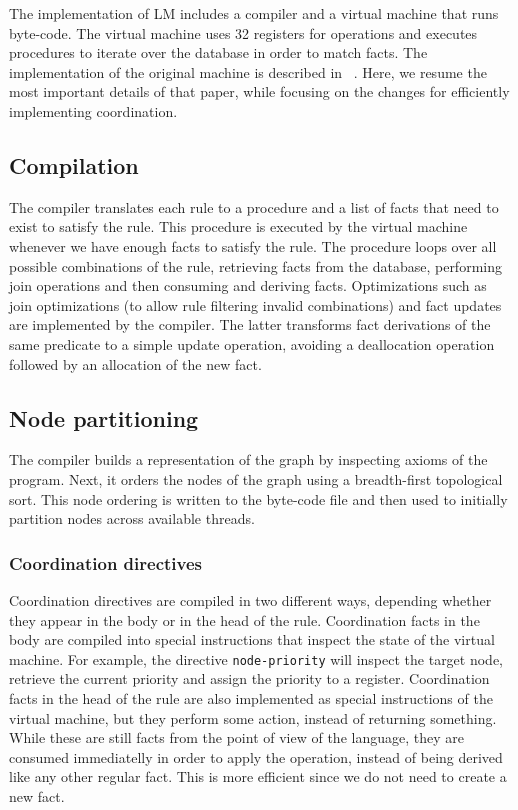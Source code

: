 The implementation of LM includes a compiler and a virtual machine that runs
byte-code. The virtual machine uses 32 registers for
operations and executes procedures to iterate over the database in order to match facts.
The implementation of the original machine is described in ~\cite{cruz-ppdp14}.
Here, we resume the most important details of that paper, while focusing on the
changes for efficiently implementing coordination.

\subsection{Compilation}

The compiler translates each rule to a procedure and a list of facts that need
to exist to satisfy the rule. This procedure is executed by the virtual
machine whenever we have enough facts to satisfy the rule. The procedure
loops over all possible combinations of the rule, retrieving facts from the
database, performing join operations and then consuming and deriving facts.
Optimizations such as join optimizations (to allow rule filtering invalid
combinations) and fact updates are implemented by the compiler. The latter
transforms fact derivations of the same predicate to a simple update operation,
avoiding a deallocation operation followed by an allocation of the new fact.

\subsection{Node partitioning}

The compiler builds a representation of the graph by inspecting axioms of the
program. Next, it orders the nodes of the graph using a breadth-first
topological sort. This node ordering is written to the byte-code file and then
used to initially partition nodes across available threads.

\subsubsection{Coordination directives}

Coordination directives are compiled in two different ways, depending whether they
appear in the body or in the head of the rule. Coordination facts in the body
are compiled into special instructions that inspect the state of the virtual
machine. For example, the directive \texttt{node-priority} will inspect the
target node, retrieve the current priority and assign the priority to a
register. Coordination facts in the head of the rule are also implemented as
special instructions of the virtual machine, but they perform some action,
instead of returning something. While these are still facts from the point of
view of the language, they are consumed immediatelly in order to apply the
operation, instead of being derived like any other regular fact. This is more
efficient since we do not need to create a new fact.

